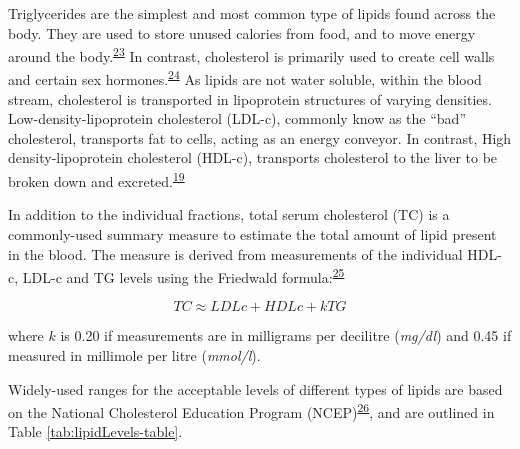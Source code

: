 \documentclass[a4paper, twoside]{templates/ociamthesis}
\begin{document}
Triglycerides are the simplest and most common type of lipids found across the body. They are used to store unused calories from food, and to move energy around the body.\textsuperscript{\protect\hyperlink{ref-laufs2020}{23}} In contrast, cholesterol is primarily used to create cell walls and certain sex hormones.\textsuperscript{\protect\hyperlink{ref-zampelas2019}{24}} As lipids are not water soluble, within the blood stream, cholesterol is transported in lipoprotein structures of varying densities. Low-density-lipoprotein cholesterol (LDL-c), commonly know as the ``bad'' cholesterol, transports fat to cells, acting as an energy conveyor. In contrast, High density-lipoprotein cholesterol (HDL-c), transports cholesterol to the liver to be broken down and excreted.\textsuperscript{\protect\hyperlink{ref-feingold2000}{19}}

In addition to the individual fractions, total serum cholesterol (TC) is a commonly-used summary measure to estimate the total amount of lipid present in the blood. The measure is derived from measurements of the individual HDL-c, LDL-c and TG levels using the Friedwald formula:\textsuperscript{\protect\hyperlink{ref-friedewald1972}{25}}

\begin{equation}
  TC \approx LDLc + HDLc + kTG
  \label{eq:total-cholesterol-formula}
\end{equation}

where \(k\) is 0.20 if measurements are in milligrams per decilitre (\emph{mg/dl}) and 0.45 if measured in millimole per litre (\emph{mmol/l}).

Widely-used ranges for the acceptable levels of different types of lipids are based on the National Cholesterol Education Program (NCEP)\textsuperscript{\protect\hyperlink{ref-national2002third}{26}}, and are outlined in Table \ref{tab:lipidLevels-table}.

~
\end{document}

